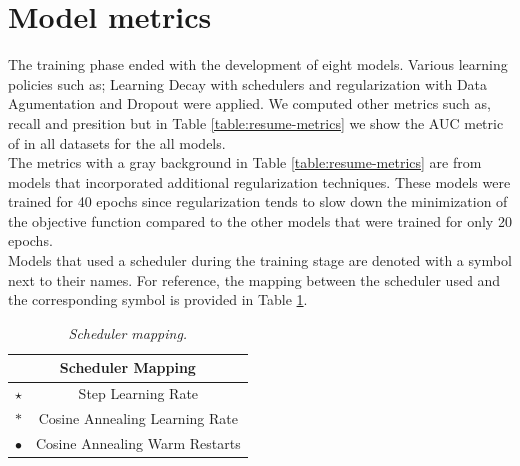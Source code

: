 \section{Model metrics}

The training phase ended with the development of eight models. Various learning
policies such as; Learning Decay with schedulers and regularization with Data
Agumentation and Dropout were applied. We computed other metrics such as,
recall and presition but in Table \ref{table:resume-metrics} we show the AUC
metric of in all datasets for the all models. \\

The metrics with a gray background in Table \ref{table:resume-metrics}
are from models that incorporated additional regularization techniques. These
models were trained for 40 epochs since regularization tends to slow down the
minimization of the objective function compared to the other models that were
trained for only 20 epochs. \\

Models that used a scheduler during the training stage are denoted with a
symbol next to their names. For reference, the mapping between the scheduler
used and the corresponding symbol is provided in Table
\ref{table:scheduler-mapping}.


\begin{table}[H]
  \centering
  \begin{tabular}{cc}
    \toprule
    \multicolumn{2}{c}{\textbf{Scheduler Mapping}} \\
    \midrule
    $\star$     & Step Learning Rate \\
    $\ast$      & Cosine Annealing Learning Rate \\
    $\bullet$   & Cosine Annealing Warm Restarts \\
    \bottomrule
  \end{tabular}
  \caption[Scheduler mapping]
  {\textit{Scheduler mapping.}}
  \label{table:scheduler-mapping}
\end{table}

